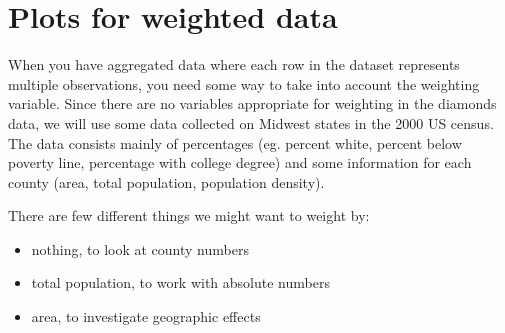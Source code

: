 % 
% 
% 
% 
% 
% 

\section{Plots for weighted data}\label{sec:weighted_data}

When you have aggregated data where each row in the dataset represents multiple observations, you need some way to take into account the weighting variable.  Since there are no variables appropriate for weighting in the diamonds data, we will use some data collected on Midwest states in the 2000 US census.  The data consists mainly of percentages (eg. percent white, percent below poverty line, percentage with college degree) and some information for each county (area, total population, population density).

There are few different things we might want to weight by: 

\begin{itemize}
	\item nothing, to look at county numbers
	\item total population, to work with absolute numbers
	\item area, to investigate geographic effects
\end{itemize}

